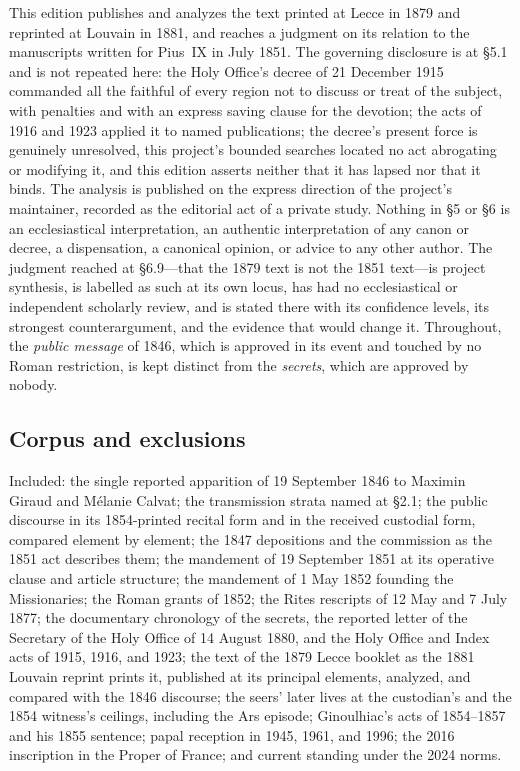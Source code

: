 This edition publishes and analyzes the text printed at Lecce in
1879 and reprinted at Louvain in 1881, and reaches a judgment on its
relation to the manuscripts written for Pius~IX in July 1851. The
governing disclosure is at \S5.1 and is not repeated here: the Holy
Office's decree of 21 December 1915 commanded all the faithful of
every region not to discuss or treat of the subject, with penalties
and with an express saving clause for the devotion; the acts of 1916
and 1923 applied it to named publications; the decree's present
force is genuinely unresolved, this project's bounded searches
located no act abrogating or modifying it, and this edition asserts
neither that it has lapsed nor that it binds. The analysis is
published on the express direction of the project's maintainer,
recorded as the editorial act of a private study. Nothing in \S5 or
\S6 is an ecclesiastical interpretation, an authentic interpretation
of any canon or decree, a dispensation, a canonical opinion, or
advice to any other author. The judgment reached at \S6.9---that the
1879 text is not the 1851 text---is project synthesis, is labelled
as such at its own locus, has had no ecclesiastical or independent
scholarly review, and is stated there with its confidence levels,
its strongest counterargument, and the evidence that would change
it. Throughout, the \emph{public message} of 1846, which is approved
in its event and touched by no Roman restriction, is kept distinct
from the \emph{secrets}, which are approved by nobody.

\subsection*{Corpus and exclusions}

Included: the single reported apparition of 19 September 1846 to
Maximin Giraud and Mélanie Calvat; the transmission strata named at
\S2.1; the public discourse in its 1854-printed recital form and in
the received custodial form, compared element by element; the 1847
depositions and the commission as the 1851 act describes them; the
mandement of 19 September 1851 at its operative clause and article
structure; the mandement of 1 May 1852 founding the Missionaries;
the Roman grants of 1852; the Rites rescripts of 12 May and 7 July
1877; the documentary chronology of the secrets, the reported letter
of the Secretary of the Holy Office of 14 August 1880, and the Holy
Office and Index acts of 1915, 1916, and 1923; the text of the 1879
Lecce booklet as the 1881 Louvain reprint prints it, published at
its principal elements, analyzed, and compared with the 1846
discourse; the seers' later lives at
the custodian's and the 1854 witness's ceilings, including the Ars
episode; Ginoulhiac's acts of 1854--1857 and his 1855 sentence; papal
reception in 1945, 1961, and 1996; the 2016 inscription in the
Proper of France; and current standing under the 2024 norms.

